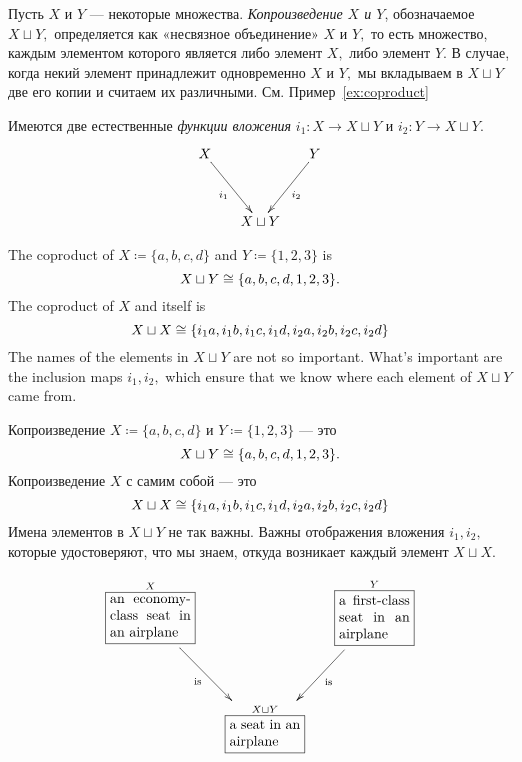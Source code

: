 \documentclass[../main/CT4S-EN-RU]{subfiles}
\begin{document}
\begin{definitionRUS}\label{def:coproduct}
Пусть $X$ и $Y$ — некоторые множества. {\em Копроизведение $X$ и $Y$}, обозначаемое $X\sqcup Y,$ определяется как «несвязное объединение» $X$ и $Y,$ то есть множество, каждым элементом которого является либо элемент $X,$ либо элемент $Y.$ В случае, когда некий элемент принадлежит одновременно $X$ и $Y,$ мы вкладываем в $X\sqcup Y$ две его копии и считаем их различными. См. Пример~\ref{ex:coproduct}

Имеются две естественные {\em функции вложения} $i_1\colon X{→} X\sqcup Y$ и $i_2\colon Y{→} X\sqcup Y.$
$$
\xymatrix@=15pt{X\ar[ddr]_{i_1}&&Y\ar[ddl]^{i_2}\\\\&X\sqcup Y}
$$
\end{definitionRUS}

\begin{exampleENG}\label{ex:coproduct}
The coproduct of $X{\coloneqq}\{a,b,c,d\}$ and $Y{\coloneqq}\{1,2,3\}$ is $$X\sqcup Y\cong\{a,b,c,d,1,2,3\}.$$ The coproduct of $X$ and itself is $$X\sqcup X\cong\{i_1a,i_1b,i_1c,i_1d,i_2a,i_2b,i_2c,i_2d\}$$ 
The names of the elements in $X\sqcup Y$ are not so important. What's important are the inclusion maps $i_1,i_2,$ which ensure that we know where each element of $X\sqcup Y$ came from.
\end{exampleENG}

\begin{exampleRUS}\label{ex:coproduct}
Копроизведение $X{\coloneqq}\{a,b,c,d\}$ и $Y{\coloneqq}\{1,2,3\}$ — это
$$X\sqcup Y\cong\{a,b,c,d,1,2,3\}.$$
Копроизведение $X$ с самим собой — это
$$X\sqcup X\cong\{i_1a,i_1b,i_1c,i_1d,i_2a,i_2b,i_2c,i_2d\}$$
Имена элементов в $X\sqcup Y$ не так важны. Важны отображения вложения $i_1,i_2,$ которые удостоверяют, что мы знаем, откуда возникает каждый элемент $X\sqcup X.$
\end{exampleRUS}

\begin{exampleENG}\label{ex:airplanes}
\begin{align}\label{dia:airplane}
\xymatrix@=15pt{
\obox{X}{.8in}{an economy-class seat in an airplane}\LAL{ddr}{is}&&\obox{Y}{.7in}{a first-class seat in an airplane}\LA{ddl}{is}\\\\
&\obox{X\sqcup Y}{.7in}{a seat in an airplane}
}
\end{align}
\end{exampleENG}
\end{document}
